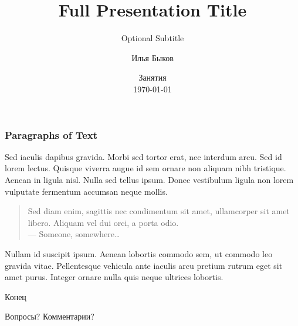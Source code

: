 \documentclass{beamer}
\title{Full Presentation Title} %
\subtitle{Optional Subtitle} %
\author{Илья Быков}
\institute{Санкт-Петербургский государственный университет \\ \smallskip \textit{i.bykov@spbu.ru}} %
\date{Занятия \\ \today} %
\begin{document}

\begin{frame}
	\titlepage %
\end{frame}


\begin{frame}
	\frametitle{Paragraphs of Text}
	
	Sed iaculis \alert{dapibus gravida}. Morbi sed tortor erat, nec interdum arcu. Sed id lorem lectus. Quisque viverra augue id sem ornare non aliquam nibh tristique. Aenean in ligula nisl. Nulla sed tellus ipsum. Donec vestibulum ligula non lorem vulputate fermentum accumsan neque mollis.
	
	\bigskip %
	
	\begin{quote}
		Sed diam enim, sagittis nec condimentum sit amet, ullamcorper sit amet libero. Aliquam vel dui orci, a porta odio.\\
		--- Someone, somewhere\ldots
	\end{quote}
	
	\bigskip %
	
	Nullam id suscipit ipsum. Aenean lobortis commodo sem, ut commodo leo gravida vitae. Pellentesque vehicula ante iaculis arcu pretium rutrum eget sit amet purus. Integer ornare nulla quis neque ultrices lobortis.
\end{frame}


\begin{frame}[plain] %
	\begin{center}
		{\Huge Конец}

		\bigskip\bigskip %
		
		{\LARGE Вопросы? Комментарии?}
	\end{center}
\end{frame}
\end{document}
